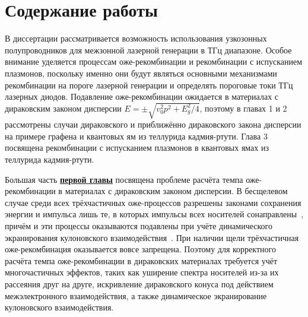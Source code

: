 \chapter*{Содержание работы}
В диссертации рассматривается возможность использования узкозонных полупроводников для межзонной лазерной генерации в ТГц диапазоне. Особое внимание уделяется процессам оже-рекомбинации и рекомбинации с испусканием плазмонов, поскольку именно они будут являться основными механизмами рекомбинации на пороге лазерной генерации и определять пороговые токи ТГц лазерных диодов. Подавление оже-рекомбинации ожидается в материалах с дираковским законом дисперсии $E = \pm\sqrt{v_0^2 p^2 + E_g^2/4}$, поэтому в главах 1 и 2 рассмотрены случаи дираковского и приближённо дираковского закона дисперсии на примере графена и квантовых ям из теллурида кадмия-ртути. Глава 3 посвящена рекомбинации с испусканием плазмонов в квантовых ямах из теллурида кадмия-ртути.

Большая часть \underline{\textbf{первой главы}} посвящена проблеме расчёта темпа оже-рекомбинации в материалах с дираковским законом дисперсии. В бесщелевом случае среди всех трёхчастичных оже-процессов разрешены законами сохранения энергии и импульса лишь те, в которых импульсы всех носителей сонаправлены~\cite{Rana-Auger}, причём и эти процессы оказываются подавлены при учёте динамического экранирования кулоновского взаимодействия~\cite{Tomadin-theory}. При наличии щели трёхчастичная оже-рекомбинация оказывается вовсе запрещена. Поэтому для корректного расчёта темпа оже-рекомбинации в дираковских материалах требуется учёт многочастичных эффектов, таких как уширение спектра носителей из-за их рассеяния друг на друге, искривление дираковского конуса под действием межэлектронного взаимодействия, а также динамическое экранирование кулоновского взаимодействия.


